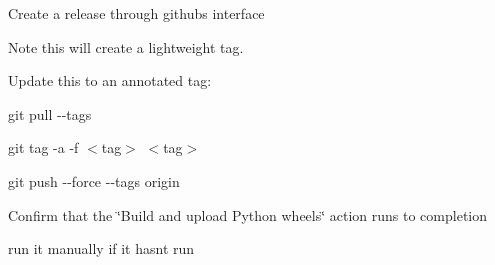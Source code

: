 \begin{DoxyItemize}
\item Create a release through github\textquotesingle{}s interface
\begin{DoxyItemize}
\item Note this will create a lightweight tag.
\item Update this to an annotated tag\+:
\begin{DoxyItemize}
\item {\ttfamily git pull -\/-\/tags}
\item {\ttfamily git tag -\/a -\/f $<$tag$>$ $<$tag$>$}
\item {\ttfamily git push -\/-\/force -\/-\/tags origin}
\end{DoxyItemize}
\end{DoxyItemize}
\item Confirm that the \char`\"{}\+Build and upload Python wheels\char`\"{} action runs to completion
\begin{DoxyItemize}
\item run it manually if it hasn\textquotesingle{}t run 
\end{DoxyItemize}
\end{DoxyItemize}